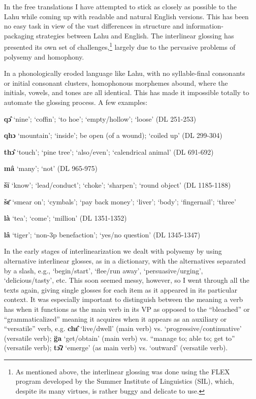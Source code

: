 In the free translations I have attempted to stick as closely as
possible to the Lahu while coming up with readable and natural English
versions. This has been no easy task in view of the vast differences in
structure and information-packaging strategies between Lahu and English.
The interlinear glossing has presented its own set of
challenges,\footnote{As mentioned above, the interlinear glossing was
  done using the FLEX program developed by the Summer Institute of
  Linguistics (SIL), which, despite its many virtues, is rather buggy
  and delicate to use.} largely due to the pervasive problems of
polysemy and homophony.

In a phonologically eroded language like Lahu, with no syllable-final
consonants or initial consonant clusters, homophonous morphemes abound,
where the initials, vowels, and tones are all identical. This has made
it impossible totally to automate the glossing process. A few examples:

\textbf{qɔ̂} `nine'; `coffin'; `to hoe'; `empty/hollow'; `loose' (DL
251-253)

\textbf{qhɔ} `mountain'; `inside'; be open (of a wound); `coiled up'
(DL 299-304)

\textbf{thɔ̂} `touch'; `pine tree'; `also/even'; `calendrical animal' (DL
691-692)

\textbf{mâ} `many'; `not' (DL 965-975)

\textbf{šī} `know'; `lead/conduct'; `choke'; `sharpen'; `round object'
(DL 1185-1188)

\textbf{šɛ̄} `smear on'; `cymbals'; `pay back money'; `liver'; `body';
`fingernail'; `three'

\textbf{là} `tea'; `come'; `million' (DL 1351-1352)

\textbf{lâ} `tiger'; `non-3p benefaction'; `yes/no question' (DL
1345-1347)

In the early stages of interlinearization we dealt with polysemy by
using alternative interlinear glosses, as in a dictionary, with the
alternatives separated by a slash, e.g., `begin/start', `flee/run away',
`persuasive/urging', `delicious/tasty', etc. This soon seemed messy,
however, so I went through all the texts again, giving single glosses
for each item as it appeared in its particular context. It was
especially important to distinguish between the meaning a verb has when
it functions as the main verb in its VP as opposed to the ``bleached'' or
``grammaticalized'' meaning it acquires when it appears as an auxiliary or
``versatile'' verb, e.g. \textbf{chɛ̂} `live/dwell' (main verb) vs.
`progressive/continuative' (versatile verb); \textbf{g̈a} `get/obtain'
(main verb) vs. ``manage to; able to; get to'' (versatile verb);
\textbf{tɔ̂ʔ} `emerge' (as main verb) vs. `outward' (versatile verb).

